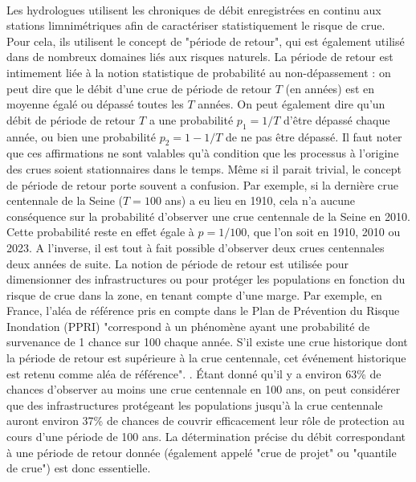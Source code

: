 \documentclass[11pt]{article}
\begin{document}
	\paragraph{} Les hydrologues utilisent les chroniques de débit enregistrées en continu aux stations limnimétriques afin de caractériser statistiquement le risque de crue. Pour cela, ils utilisent le concept de "période de retour", qui est également utilisé dans de nombreux domaines liés aux risques naturels. La période de retour est intimement liée à la notion statistique de probabilité au non-dépassement : on peut dire que le débit d'une crue de période de retour $T$ (en années) est en moyenne égalé ou dépassé toutes les $T$ années. On peut également dire qu'un débit de période de retour $T$ a une probabilité $p_1 = 1/T$ d'être dépassé chaque année, ou bien une probabilité $p_2 = 1-1/T$ de ne pas être dépassé. Il faut noter que ces affirmations ne sont valables qu'à condition que les processus à l'origine des crues soient stationnaires dans le temps. Même si il parait trivial, le concept de période de retour porte souvent a confusion. Par exemple, si la dernière crue centennale de la Seine ($T = 100$ ans) a eu lieu en 1910, cela n'a aucune conséquence sur la probabilité d'observer une crue centennale de la Seine en 2010. Cette probabilité reste en effet égale à $p = 1/100$, que l'on soit en 1910, 2010 ou 2023. A l'inverse, il est tout à fait possible d'observer deux crues centennales deux années de suite. La notion de période de retour est utilisée pour dimensionner des infrastructures ou pour protéger les populations en fonction du risque de crue dans la zone, en tenant compte d'une marge. Par exemple, en France, l'aléa de référence pris en compte dans le Plan de Prévention du Risque Inondation (PPRI) "correspond à un phénomène ayant une probabilité de survenance de 1 chance sur 100 chaque année. S'il existe une crue historique dont la période de retour est supérieure à la crue centennale, cet événement historique est retenu comme aléa de référence". \citep{medd_site_nodate}. Étant donné qu'il y a environ 63\% de chances d'observer au moins une crue centennale en 100 ans, on peut considérer que des infrastructures protégeant les populations jusqu'à la crue centennale auront environ 37\% de chances de couvrir efficacement leur rôle de protection au cours d'une période de 100 ans. La détermination précise du débit correspondant à une période de retour donnée (également appelé "crue de projet" ou "quantile de crue") est donc essentielle.
	
\end{document}

